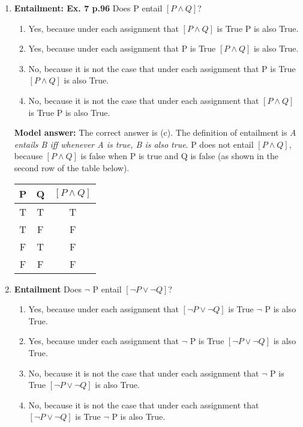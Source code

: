 \documentclass[a4,11pt]{article}
\newcommand{\6}{\mbox{$[\hspace*{-.6mm}[$}}
\newcommand{\9}{\mbox{$]\hspace*{-.6mm}]$}}
\begin{document}
\begin{enumerate}[leftmargin = 12pt]
\begin{enumerate}
\item T T T F equivalent
\item T T T F not equivalent
\item T F T F equivalent
\item T F T F not equivalent
\item T F T F equivalent
\item F F T F not equivalent
\end{enumerate}


{ \bf Model answer:} The correct answer is {\it T T T F equivalent}. The formulae are equivalent because they have the same truth values under every assignment.

\item {\bf Entailment: Ex. 7 p.96} Does P entail $[P \land Q]$?

\begin{enumerate}[noitemsep]
\item Yes, because under each assignment that $[P \land Q]$ is True P is also True.
\item Yes, because under each assignment that P is True $[P \land Q]$ is also True.
\item No, because it is not the case that under each assignment that P is True $[P \land Q]$ is also True.
\item No, because it is not the case that under each assignment that $[P \land Q]$ is True P is also True.
\end{enumerate}

{ \bf Model answer:}  The correct answer is (c). The definition of entailment is {\it A entails B iff whenever A is true, B is also true}. P does not entail $[P \land Q]$, because $[P \land Q]$ is false when P is true and Q is false (as shown in the second row of the table below).

\begin{tabular}{c | c | c }
\hline \hline
P & Q &  $[P \land Q]$  \\
\hline
T & T & T \\
 T & F & F \\
F & T & F \\
F & F & F \\
\hline \hline
\end{tabular}

\item  {\bf Entailment} Does $\neg$ P entail $[ \neg P \lor \neg Q ]$?

\begin{enumerate}[noitemsep]
\item Yes, because under each assignment that $[ \neg P \lor \neg Q ]$ is True $\neg$ P is also True.
\item Yes, because under each assignment that $\neg$ P is True $[ \neg P \lor \neg Q ]$ is also True.
\item No, because it is not the case that under each assignment that $\neg$ P is True $[ \neg P \lor \neg Q ]$ is also True.
\item No, because it is not the case that under each assignment that $[ \neg P \lor \neg Q ]$ is True $\neg$ P is also True.
\end{enumerate}


\end{enumerate}
\end{document}
